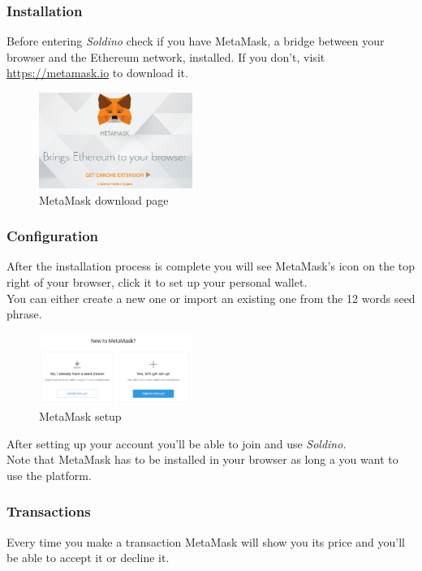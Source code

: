 	\subsubsection{Installation}
	Before entering \textit{Soldino} check if you have MetaMask, a bridge between 
	your browser and the Ethereum network, installed. 
	If you don't, visit \url{https://metamask.io} to download it.\newline
	\begin{figure}[H]
		\includegraphics[width=5cm]{res/images/MetaMask_download.png}
		\centering
		\caption{MetaMask download page}
	\end{figure}
	\subsubsection{Configuration}
	After the installation process is complete you will see MetaMask's icon 
	on the top right of your browser, click it to set up your personal wallet.\\
	You can either create a new one or import an existing one from the 12 
	words seed phrase.
	\begin{figure}[H]
		\includegraphics[width=5cm]{res/images/MetaMask_select.png}
		\centering
		\caption{MetaMask setup}
	\end{figure}
	\noindent After setting up your account you'll be able to join and use \textit{Soldino}.
	\newline \\
	Note that MetaMask has to be installed in your browser as long a you want 
	to use the platform.
	\subsubsection{Transactions}
	Every time you make a transaction MetaMask will show you its price and you'll
	be able to accept it or decline it.

